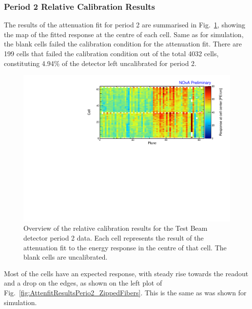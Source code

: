 \subsubsection*{Period 2 Relative Calibration Results}

The results of the attenuation fit for period 2 are summarised in Fig.~\ref{fig:CellCentreResponsePeriod2}, showing the map of the fitted response at the centre of each cell. Same as for simulation, the blank cells failed the calibration condition for the attenuation fit. There are 199 cells that failed the calibration condition out of the total 4032 cells, constituting 4.94\% of the detector left uncalibrated for period 2.

\begin{figure}[h]
\centering
\includegraphics[width=\textwidth]{Plots/TBCalibration/CellResponseAtCentre_period2_Limited_NOvAPlotStyle.pdf}
\caption[Map of fitted response at cell centre for period 2 data]{Overview of the relative calibration results for the Test Beam detector period 2 data. Each cell represents the result of the attenuation fit to the energy response in the centre of that cell. The blank cells are uncalibrated.}
\label{fig:CellCentreResponsePeriod2}
\end{figure}

Most of the cells have an expected response, with steady rise towards the readout and a drop on the edges, as shown on the left plot of Fig.~\ref{fig:AttenfitResultsPerio2_ZippedFibers}. This is the same as was shown for simulation.

